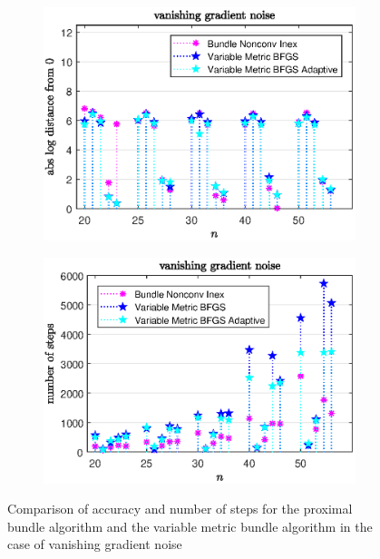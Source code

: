 \vspace{-1.5em}

\begin{figure}[H]
	\begin{subfigure}{0.49\textwidth}
		\includegraphics[width=\textwidth]{Pictures/Plots/vanishing_gradient_noise_b.eps}%
	\end{subfigure}
	\begin{subfigure}{0.49\textwidth}
		\includegraphics[width=\textwidth]{Pictures/Plots/steps_vanishing_gradient_noise_b.eps}%
	\end{subfigure}
	\caption[Accuracy and number of steps: vanishing gradient noise, higher dimensions]{Comparison of accuracy and number of steps for the proximal bundle algorithm and the variable metric bundle algorithm in the case of vanishing gradient noise}%
	\label{fig_van_grad_noise_large}%
\end{figure}

